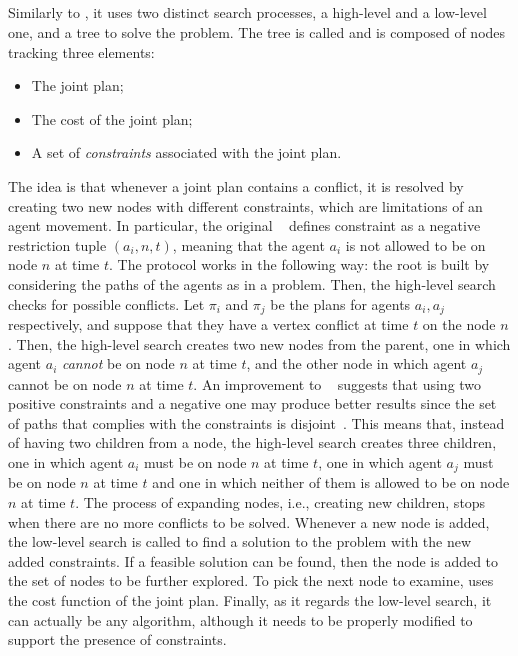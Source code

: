 \subsection{}
Similarly to , it uses two distinct search processes, a high-level 
and a low-level one, and a tree to solve the  problem. \newline
The  tree is called  and is composed of nodes tracking three
elements: 
\begin{itemize}
  \item The joint plan; 
  \item The cost of the joint plan;
  \item A set of \textit{constraints} associated with the joint plan.
\end{itemize}
The idea is that whenever a joint plan contains a conflict, it is resolved by
creating two new nodes with different constraints, which are limitations of an
agent movement. In particular, the original ~\cite{CBS} defines
constraint as a negative restriction tuple $(a_i, n, t)$, meaning that the
agent $a_i$ is not allowed to be on node $n$ at time $t$. \newline
The protocol works in the following way: the root is built by considering the
paths of the agents as in a  problem. Then, the high-level search
checks for possible conflicts. Let $\pi_i$ and $\pi_j$ be the plans for agents
$a_i, a_j$ respectively, and suppose that they have a vertex conflict at time
$t$ on the node $n$. Then, the high-level search creates two new  nodes
from the parent, one in which agent $a_i$ \textit{cannot} be on node $n$ at
time $t$, and the other  node in which agent $a_j$ cannot be on node
$n$ at time $t$. \newline
An improvement to ~\cite{ICBS} suggests that using two positive
constraints and a negative one may produce better results since the set of
paths that complies with the constraints is disjoint~\cite{MAPF_overview}. This
means that, instead of having two children from a node, the high-level search
creates three children, one in which agent $a_i$ must be on node $n$ at time
$t$, one in which agent $a_j$ must be on node $n$ at time $t$ and one in which
neither of them is allowed to be on node $n$ at time $t$. \newline
The process of expanding nodes, i.e., creating new children, stops when there
are no more conflicts to be solved. \newline
Whenever a new node is added, the low-level search is called to find a solution
to the problem with the new added constraints. If a feasible solution can be
found, then the node is added to the set of nodes to be further explored. To
pick the next node to examine,  uses the cost function of the joint
plan. \newline
Finally, as it regards the low-level search, it can actually be any 
algorithm, although it needs to be properly modified to support the presence of
constraints. 
%
